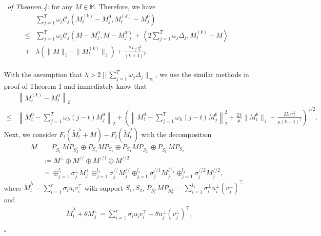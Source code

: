 \documentclass[12pt]{article}
\newenvironment{pf}{{\noindent\it Proof}\ }{\hfill $\square$\par}
\begin{document}
\begin{pf}{\it of Theorem 4:}
  for any $M\in \mathbb{M}$.
  Therefore, we have
  \begin{equation*}
  \begin{aligned}
  &\sum_{j=1}^T \omega_j \mathcal{C}_j(M_t^{(k)}- M_j^0,M_t^{(k)}- M_j^0)\\ \le & \sum_{j = 1}^T \omega_j \mathcal{C}_j(M-M_j^0,M-M_j^0) +\left\langle 2\sum_{j=1}^T \omega_j  \Delta_j,M_t^{(k)} - M\right \rangle \\+&\lambda (\|M\|_1-\|M_t^{(k)}\|_1) +\frac{2L_f\gamma_t^2}{(k+1)^2}.
  \end{aligned} 
  \end{equation*}\\
  With the assumption that $\lambda >2\|\sum_{j=1}^T \omega_j\Delta_j\|_{\infty}$, we use the similar methods in proof of Theorem 1 and immediately know that
  \begin{equation*}
  \begin{aligned}
  &\left\|M_t^{(k)} - M_t^0\right\|_2\\\le & \left\|M_t^0-\sum_{j=1}^T \omega_h(j-t) M_j^0\right\|_2 +\left(\left\|M_t^0-\sum_{j=1}^T \omega_h(j-t) M_j^0\right\|_2^2 +\frac{2\lambda}{\mu}\|M_t^0\|_1 + \frac{2L_f\gamma_t^2}{\mu(k+1)^2}\right)^{1/2}.
  \end{aligned}
  \end{equation*}
  Next, we consider $F_t(\widetilde{M}_t^\lambda +  M) - F_t(\widetilde{M}_t^\lambda)$ with the decomposition 
  \begin{equation*}
  \begin{aligned}
  M &=P_{S_1^\perp} M P_{S_2^\perp}\oplus P_{S_1}M P_{S_2}\oplus P_{S_1}MP_{S_2^\perp} \oplus P_{S_1^\perp}MP_{S_2}\\&:=
  M^{\perp}\oplus M^{//}\oplus M^{//1}\oplus M^{//2}
  \\&=  \oplus_{j=1}^{l_1} \sigma^{\perp}_j M^{\perp}_j \oplus_{j=1}^{l_2}\sigma_j^{//}M^{//}_j\oplus_{j=1}^{l_3} \sigma_j^{//1}M_j^{//_1} \oplus_{j=1}^{l_4}\sigma_j^{//2} M_j^{//2},
  \end{aligned}
  \end{equation*}
  where $\widetilde{M}_t^\lambda=\sum_{i=1}^r \sigma_i u_i v_i^\top$ with support $S_1,S_2$, $P_{S_1^\perp}MP_{S_2^{\perp}}=\sum_{i=1}^{l_1} \sigma^{\perp}_i u^{\perp}_i (v^{\perp}_j)^\top$ and 
  \begin{equation*}
  \begin{aligned}
  &\widetilde{M}_t^\lambda +\theta M^{\perp}_j = \sum_{i=1}^r \sigma_i u_i v_i^\top + \theta  u^{\perp}_j (v^{\perp}_j)^\top,\\

\end{aligned}
\end{equation*}
\end{pf}
\end{document}
